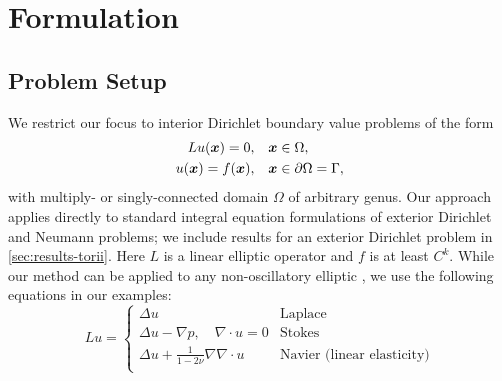 \section{Formulation\label{sec:formulation}}
\subsection{Problem Setup}

We restrict our focus to interior
Dirichlet boundary value problems of the form
\begin{align}
  L u({\bm{x}}) =  0,& \quad {\bm{x}} \in \Omega,\\
  u({\bm{x}}) =  f({\bm{x}}),& \quad {\bm{x}} \in \partial\Omega = \Gamma,
  \label{eq:pde}
\end{align}
with multiply- or singly-connected domain $\Omega$ of arbitrary genus. 
Our approach applies directly to standard integral equation formulations of exterior Dirichlet and Neumann problems; we include results for an exterior Dirichlet problem in \cref{sec:results-torii}.
Here $L$ is a linear elliptic operator and $f$ is at least $C^k$.
While our method can be applied to any non-oscillatory elliptic \pde, we use the following equations in our examples: 
\begin{equation}
  Lu =\begin{cases}
    \Delta u & \text{Laplace}\\
    \Delta u  - \nabla p, \quad \nabla \cdot u = 0 & \text{Stokes}\\
    \Delta u  + \frac{1}{1-2\nu}\nabla \nabla\cdot u & \text{Navier (linear elasticity)}\\
  \end{cases}
  \label{eq:pdes}
\end{equation}

